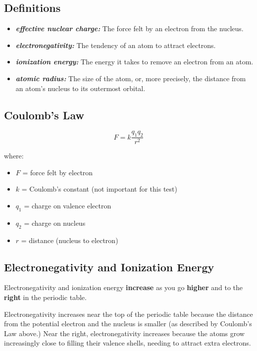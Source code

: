 \documentclass[a4paper, 12pt]{article}
\begin{document}
\subsection{Definitions}
\begin{itemize}[leftmargin=*, nosep]
    \item \textbf{\textit{effective nuclear charge:}} The force felt by an electron from the nucleus.
    \item \textbf{\textit{electronegativity:}} The tendency of an atom to attract electrons.
    \item \textbf{\textit{ionization energy:}} The energy it takes to remove an electron from an atom.
    \item \textbf{\textit{atomic radius:}} The size of the atom, or, more precisely, the distance from an atom's nucleus to its outermost orbital.
\end{itemize}

\subsection{Coulomb's Law}

$$F = k\frac{q_1q_2}{r^2}$$

where:
\begin{itemize}[nosep]
    \item $F$ = force felt by electron
    \item $k$ = Coulomb's constant (not important for this test)
    \item $q_1$ = charge on valence electron
    \item $q_2$ = charge on nucleus
    \item $r$ = distance (nucleus to electron)
\end{itemize}

\subsection{Electronegativity and Ionization Energy}
Electronegativity and ionization energy \textbf{increase} as you go \textbf{higher} and to the \textbf{right} in the periodic table.

Electronegativity increases near the top of the periodic table because the distance from the potential electron and the nucleus is smaller (as described by Coulomb's Law above.) Near the right, electronegativity increases because the atoms grow increasingly close to filling their valence shells, needing to attract extra electrons.
\end{document}
